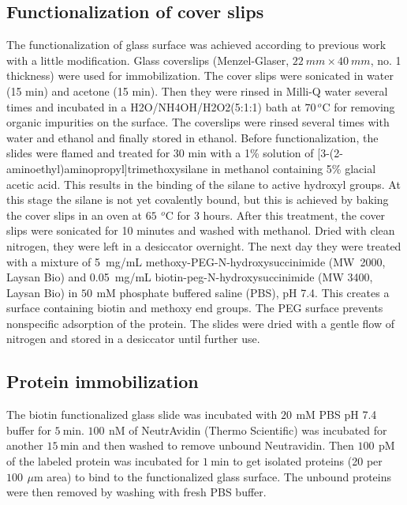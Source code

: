 \documentclass[journal=jacsat,manuscript=article]{achemso}
\newcommand{\um}{\ensuremath{\,\mu\textrm{m}}}
\newcommand{\mM}{\ensuremath{\,\textrm{mM}}}
\newcommand{\nM}{\ensuremath{\,\textrm{nM}}}
\newcommand{\pM}{\ensuremath{\,\textrm{pM}}}
\newcommand{\degree}{\ensuremath{\,^o\textrm{C}}}
\begin{document}
\subsection{Functionalization of cover slips}
The functionalization of glass surface was achieved according to previous work with a little modification.\cite{gupta2012involvement} Glass coverslips (Menzel-Glaser, $22~mm \times 40~mm$, no. 1 thickness) were used for immobilization. The cover slips were sonicated in water (15 min) and acetone (15 min). Then they were rinsed in Milli-Q water several times and incubated in a H2O/NH4OH/H2O2(5:1:1) bath at $70\degree$ for removing organic impurities on the surface. The coverslips were rinsed several times with water and ethanol and finally stored in ethanol. Before functionalization, the slides were flamed and treated for 30 min with a 1\% solution of [3-(2-aminoethyl)aminopropyl]trimethoxysilane in methanol containing 5\% glacial acetic acid. This results in the binding of the silane to active hydroxyl groups. At this stage the silane is not yet covalently bound, but this is achieved by baking the cover slips in an oven at $65~\degree$ for 3 hours. After this treatment, the cover slips were sonicated for 10 minutes and washed with methanol. Dried with clean nitrogen, they were left in a desiccator overnight. The next day they were treated with a mixture of 5~mg/mL methoxy-PEG-N-hydroxysuccinimide (MW~2000, Laysan Bio) and 0.05~mg/mL
biotin-peg-N-hydroxysuccinimide (MW 3400, Laysan Bio) in $50~\mM$ phosphate buffered saline (PBS), pH 7.4. This creates a surface containing biotin and methoxy end groups. The PEG surface prevents nonspecific adsorption of the protein. The slides were dried with a gentle flow of nitrogen and stored in a desiccator until further use.
\subsection{Protein immobilization}
The biotin functionalized glass slide was incubated with $20~\mM$ PBS pH 7.4 buffer for $5~$min. $100~\nM$ of NeutrAvidin (Thermo Scientific) was incubated for another $15~$min and then washed to remove unbound Neutravidin. Then $100~\pM$ of the labeled protein was incubated for $1~$min to get isolated proteins (20 per $100~\um$ area) to bind to the functionalized glass surface. The unbound proteins were then removed by washing with fresh PBS buffer.
\end{document}
